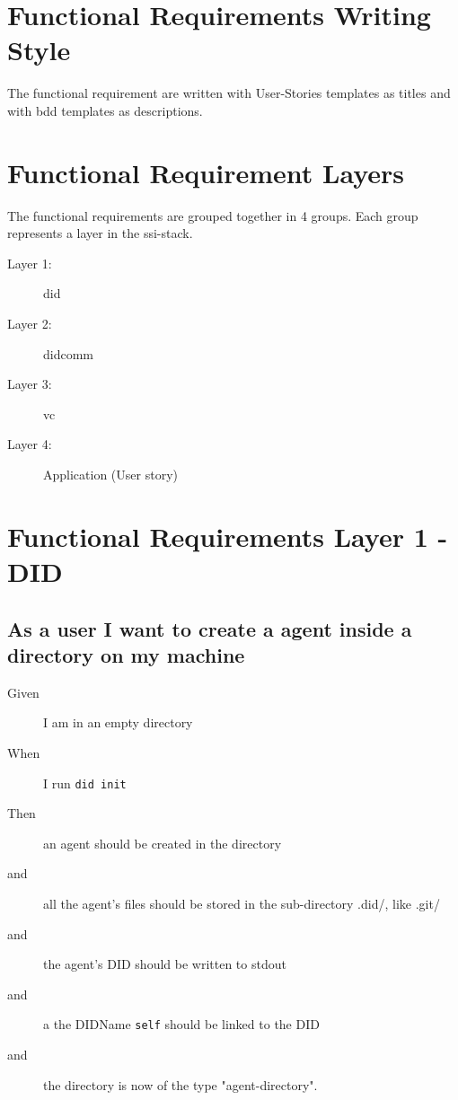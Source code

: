 \newpage

\section{Functional Requirements Writing Style}

The functional requirement are written with User-Stories templates as titles and with \acrfull{bdd} templates as descriptions.


\section{Functional Requirement Layers}

The functional requirements are grouped together in 4 groups. Each group represents a layer in the \acrshort{ssi}-stack.
\begin{description}
    \item[Layer 1:] \acrfull{did}
    \item[Layer 2:] \acrfull{didcomm}
    \item[Layer 3:] \acrfull{vc}
    \item[Layer 4:] Application (User story)
\end{description}



\newpage

\section{Functional Requirements Layer 1 - DID}


\subsection{As a user I want to create a agent inside a directory on my machine}
\begin{description}
    \item[Given] I am in an empty directory
    \item[When] I run \texttt{did init}
    \item[Then] an agent should be created in the directory
    \item[and] all the agent's files should be stored in the sub-directory .did/, like .git/
    \item[and] the agent's DID should be written to stdout 
    \item[and] a the DIDName \texttt{self} should be linked to the DID
    \item[and] the directory is now of the type "agent-directory".
\end{description}


